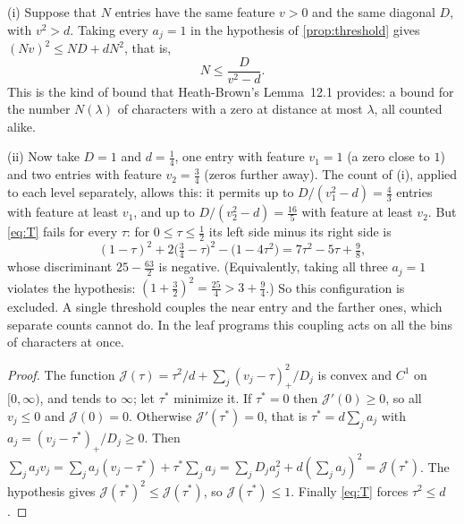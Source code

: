 \begin{example}\label{ex:twolevels}
(i) Suppose that $N$ entries have the same feature $v>0$ and the same diagonal $D$, with $v^2>d$.
Taking every $a_j=1$ in the hypothesis of \cref{prop:threshold} gives $(Nv)^2\le ND+dN^2$, that is,
\[
  N\le\frac{D}{v^2-d}.
\]
This is the kind of bound that Heath-Brown's Lemma~12.1 provides: a bound for the number
$N(\lambda)$ of characters with a zero at distance at most $\lambda$, all counted alike.

(ii) Now take $D=1$ and $d=\frac14$, one entry with feature $v_1=1$ (a zero close to $1$) and two
entries with feature $v_2=\frac34$ (zeros further away). The count of (i), applied to each level
separately, allows this: it permits up to $D/(v_1^2-d)=\frac43$ entries with feature at least $v_1$,
and up to $D/(v_2^2-d)=\frac{16}5$ with feature at least $v_2$. But \eqref{eq:T} fails for every $\tau$:
for $0\le\tau\le\frac12$ its left side minus its right side is
\[
  (1-\tau)^2+2\bigl(\tfrac34-\tau\bigr)^2-\bigl(1-4\tau^2\bigr)=7\tau^2-5\tau+\tfrac98,
\]
whose discriminant $25-\frac{63}2$ is negative. (Equivalently, taking all three $a_j=1$ violates the
hypothesis: $(1+\frac32)^2=\frac{25}4>3+\frac94$.) So this configuration is excluded. A single
threshold couples the near entry and the farther ones, which separate counts cannot do. In
the leaf programs this coupling acts on all the bins of characters at once.
\end{example}

\begin{proof}
The function $\mathcal J(\tau)=\tau^2/d+\sum_j(v_j-\tau)_+^2/D_j$ is convex and $C^1$ on $[0,\infty)$, and
tends to $\infty$; let $\tau^*$ minimize it. If $\tau^*=0$ then $\mathcal J'(0)\ge0$, so all $v_j\le0$ and
$\mathcal J(0)=0$. Otherwise $\mathcal J'(\tau^*)=0$, that is $\tau^*=d\sum_ja_j$ with $a_j=(v_j-\tau^*)_+/D_j\ge0$.
Then $\sum_ja_jv_j=\sum_ja_j(v_j-\tau^*)+\tau^*\sum_ja_j=\sum_jD_ja_j^2+d(\sum_ja_j)^2=\mathcal J(\tau^*)$.
The hypothesis gives $\mathcal J(\tau^*)^2\le\mathcal J(\tau^*)$, so $\mathcal J(\tau^*)\le1$. Finally \eqref{eq:T} forces
$\tau^2\le d$.
\end{proof}

